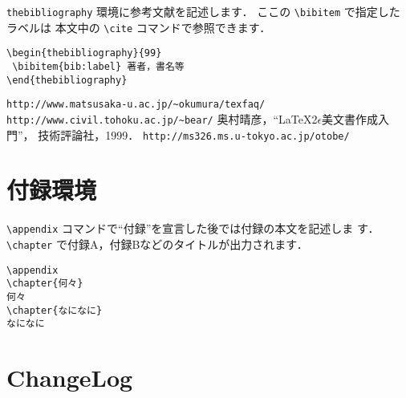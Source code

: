\documentclass[mingoth]{kut-paper}		%
\begin{document}
\begin{thebibliography}{99}
  \verb|thebibliography| 環境に参考文献を記述します．
 		 ここの \verb|\bibitem| で指定したラベルは
		 本文中の \verb|\cite| コマンドで参照できます．
\begin{verbatim}
\begin{thebibliography}{99}
 \bibitem{bib:label} 著者，書名等
\end{thebibliography}
\end{verbatim}
                 
  \verb|http://www.matsusaka-u.ac.jp/~okumura/texfaq/|
  \verb|http://www.civil.tohoku.ac.jp/~bear/|
  奥村晴彦，``\LaTeX2$\epsilon$美文書作成入門''，
		 技術評論社，1999．
  \verb|http://ms326.ms.u-tokyo.ac.jp/otobe/|
\end{thebibliography}


\appendix

\chapter{付録環境}
\verb|\appendix| コマンドで``付録''を宣言した後では付録の本文を記述しま
す．\verb|\chapter| で付録A，付録Bなどのタイトルが出力されます．
\begin{verbatim}
\appendix
\chapter{何々}
何々
\chapter{なになに}
なになに
\end{verbatim}


\chapter{ChangeLog}
\end{document}
